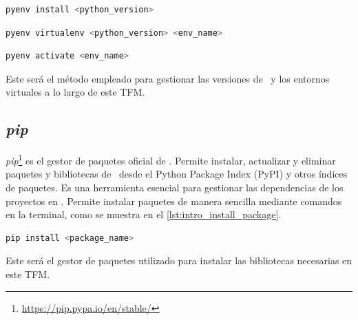 \vspace{0.2cm}
\begin{lstlisting}[language=bash, caption={Instalación de una versión específica de \python\ con \pyenv}, label={lst:install_pyenv_python}]
pyenv install <python_version>
\end{lstlisting}
\begin{lstlisting}[language=bash, caption={Creación de un entorno virtual con \pyenv}, label={lst:install_pyenv_virtualenv}]
pyenv virtualenv <python_version> <env_name>
\end{lstlisting}
\begin{lstlisting}[language=bash, caption={Activación de un entorno virtual con \pyenv}, label={lst:activate_pyenv_virtualenv}]
pyenv activate <env_name>
\end{lstlisting}

Este será el método empleado para gestionar las versiones de \python\ y los entornos virtuales a lo largo de este TFM.

\newpage
\subsection{\textit{pip}} \label{sec:intro_pip}
\textit{pip}\footnote{\url{https://pip.pypa.io/en/stable/}} es el gestor de paquetes oficial de \python. Permite instalar, actualizar y
eliminar paquetes y bibliotecas de \python\ desde el Python Package Index (PyPI) y otros índices de paquetes. 
Es una herramienta esencial para gestionar las dependencias de los proyectos en \python. Permite instalar paquetes de manera 
sencilla mediante comandos en la terminal, como se muestra en el \autoref{lst:intro_install_package}.
\begin{lstlisting}[language=bash, caption={Instalación de un paquete con \textit{pip}}, label={lst:intro_install_package}]
pip install <package_name>
\end{lstlisting}

Este será el gestor de paquetes utilizado para instalar las bibliotecas necesarias en este TFM.

